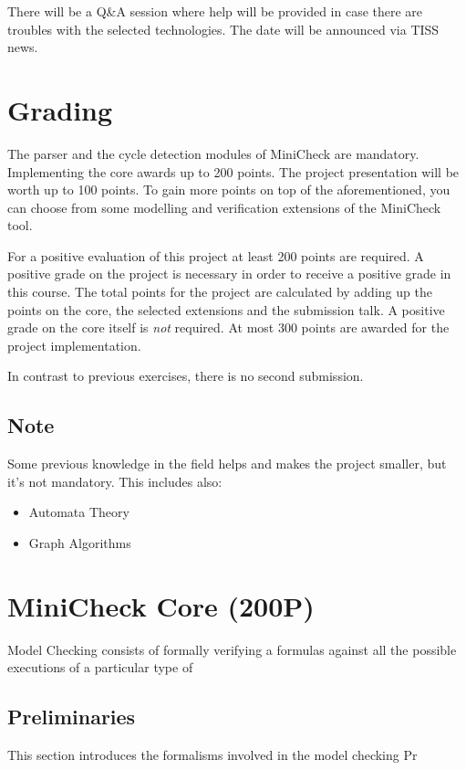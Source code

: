 \documentclass{article}
\begin{document}
There will be a Q\&A session where help will be provided in case there are troubles with the selected technologies. 
The date will be announced via TISS news.

\section{Grading}

The parser and the cycle detection modules of MiniCheck are mandatory. 
Implementing the core awards up to 200 points. The project presentation will be worth up to 100 points. 
To gain more points on top of the aforementioned, you can choose from some modelling and verification extensions of the MiniCheck tool.

For a positive evaluation of this project at least 200 points are required. A positive grade on the project is necessary 
in order to receive a positive grade in this course. The total points for the project are calculated by adding up the points on the core, 
the selected extensions and the submission talk. A positive grade on the core itself is \textit{not} required. 
At most 300 points are awarded for the project implementation.

In contrast to previous exercises, there is no second submission.

\subsection{Note}
Some previous knowledge in the field helps and makes the project smaller, 
but it's not mandatory. This includes also:
\begin{itemize}
    \item Automata Theory
    \item Graph Algorithms
\end{itemize}

\section{MiniCheck Core (200P)}

Model Checking consists of formally verifying a formulas against all the possible executions of a particular type of 

\subsection{Preliminaries}

This section introduces the formalisms involved in the model checking Pr
\end{document}
